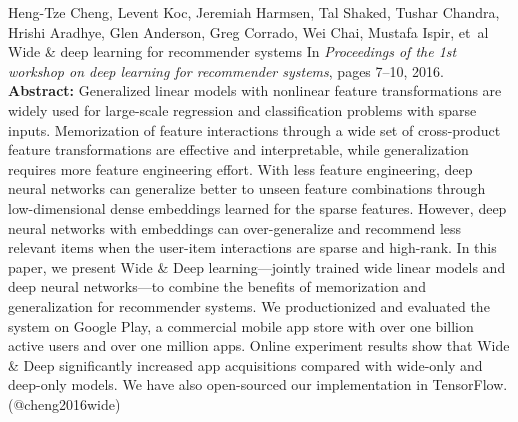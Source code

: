 \documentclass{article}
\begin{document}
\begin{thebibliography}{}
 Heng-Tze Cheng, Levent Koc, Jeremiah Harmsen, Tal Shaked, Tushar Chandra, Hrishi Aradhye, Glen Anderson, Greg Corrado, Wei Chai, Mustafa Ispir, et~al \newblock Wide \& deep learning for recommender systems \newblock In {\em Proceedings of the 1st workshop on deep learning for recommender systems}, pages 7--10, 2016. \newblock \textbf{Abstract:} Generalized linear models with nonlinear feature transformations are widely used for large-scale regression and classification problems with sparse inputs. Memorization of feature interactions through a wide set of cross-product feature transformations are effective and interpretable, while generalization requires more feature engineering effort. With less feature engineering, deep neural networks can generalize better to unseen feature combinations through low-dimensional dense embeddings learned for the sparse features. However, deep neural networks with embeddings can over-generalize and recommend less relevant items when the user-item interactions are sparse and high-rank. In this paper, we present Wide \& Deep learning---jointly trained wide linear models and deep neural networks---to combine the benefits of memorization and generalization for recommender systems. We productionized and evaluated the system on Google Play, a commercial mobile app store with over one billion active users and over one million apps. Online experiment results show that Wide \& Deep significantly increased app acquisitions compared with wide-only and deep-only models. We have also open-sourced our implementation in TensorFlow. \newblock (@cheng2016wide)


\end{thebibliography}
\end{document}
